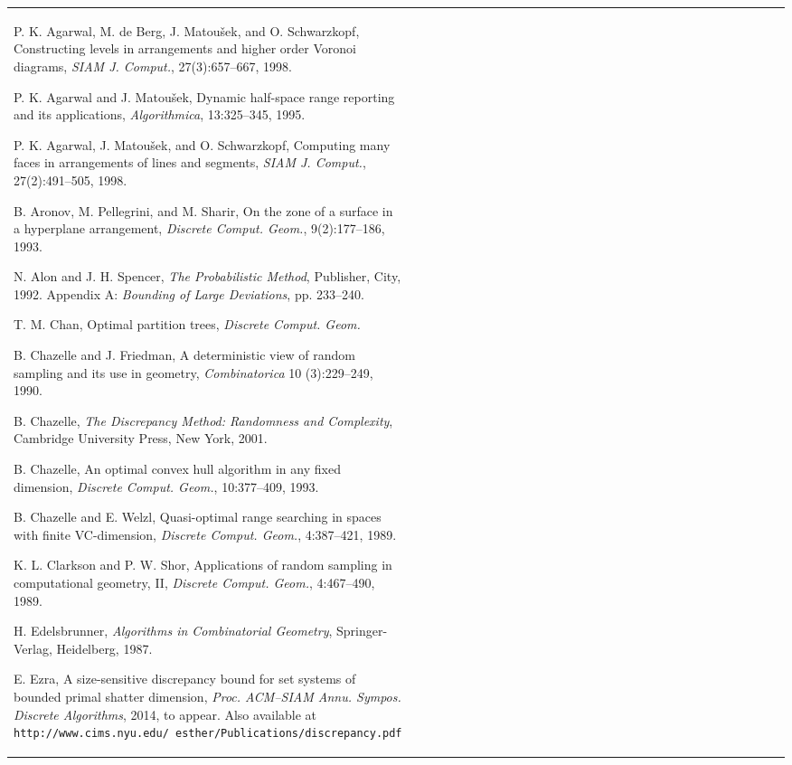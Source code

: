 \documentclass[11pt]{article}
\begin{document}
\begin{defn}
\begin{center}
\begin{tabular}{lp{1\linewidth}}
\begin{thebibliography}{}

\bibitem[AdBMS98]{adbms98}
P. K. Agarwal, M. de Berg, J. Matou\v{s}ek, and O. Schwarzkopf,
Constructing levels in arrangements and higher order Voronoi diagrams,
{\em SIAM J. Comput.}, 27(3):657--667, 1998.

\bibitem[AM95]{am95}
P. K. Agarwal and J. Matou\v{s}ek,
Dynamic half-space range reporting and its applications,
{\em Algorithmica}, 13:325--345, 1995.

\bibitem[AMS98]{ams98}
P. K. Agarwal, J. Matou\v{s}ek, and O. Schwarzkopf,
Computing many faces in arrangements of lines and segments,
{\em SIAM J. Comput.}, 27(2):491--505, 1998.

\bibitem[APS93]{aps93}
B. Aronov, M. Pellegrini, and M. Sharir,
On the zone of a surface in a hyperplane arrangement,
{\em Discrete Comput. Geom.}, 9(2):177--186, 1993.

\bibitem[AS92]{as92}
N. Alon and J. H. Spencer,
{\em The Probabilistic Method},
Publisher, City, 1992. Appendix A: {\em Bounding of Large Deviations}, pp. 233--240.

\bibitem[Ch12]{ch12}
T. M. Chan,
Optimal partition trees,
{\em Discrete Comput. Geom.}

\bibitem[CF90]{cf90}
B. Chazelle and J. Friedman,
A deterministic view of random sampling and its use in geometry,
{\em Combinatorica} 10 (3):229--249, 1990.

\bibitem[Cha01]{cha01}
B. Chazelle,
{\em The Discrepancy Method: Randomness and Complexity},
Cambridge University Press, New York, 2001.

\bibitem[Cha93]{cha93}
B. Chazelle,
An optimal convex hull algorithm in any fixed dimension,
{\em Discrete Comput. Geom.}, 10:377--409, 1993.

\bibitem[CW89]{cw89}
B. Chazelle and E. Welzl,
Quasi-optimal range searching in spaces with finite VC-dimension,
{\em Discrete Comput. Geom.}, 4:387--421, 1989.

\bibitem[CS89]{cs89}
K. L. Clarkson and P. W. Shor,
Applications of random sampling in computational geometry, II,
{\em Discrete Comput. Geom.}, 4:467--490, 1989.

\bibitem[Ed87]{ed87}
H. Edelsbrunner,
{\em Algorithms in Combinatorial Geometry},
Springer-Verlag, Heidelberg, 1987.

\bibitem[Ez14]{ez14}
E. Ezra,
A size-sensitive discrepancy bound for set systems of bounded primal
shatter dimension,
{\em Proc. ACM--SIAM Annu. Sympos. Discrete Algorithms}, 2014, to appear.
Also available at \texttt{http://www.cims.nyu.edu/~esther/Publications/discrepancy.pdf}


\end{thebibliography}
\end{tabular}
\end{center}
\end{defn}
\end{document}

